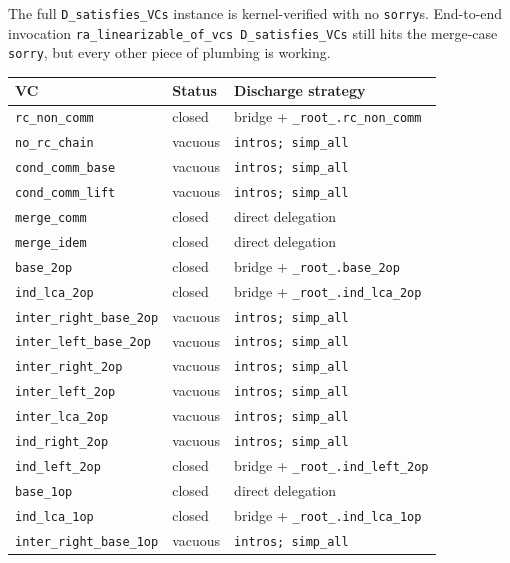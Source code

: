 \documentclass[11pt,a4paper]{article}
\theoremstyle{definition}
\theoremstyle{remark}
\newcommand{\sorry}{\texttt{sorry}}
\begin{document}
The full \texttt{D\_satisfies\_VCs} instance is kernel-verified with
no \sorry{}s. End-to-end invocation
\texttt{ra\_linearizable\_of\_vcs D\_satisfies\_VCs} still hits the
merge-case \sorry{}, but every other piece of plumbing is working.

\begin{table}[t]
  \centering
  \small
  \begin{tabular}{@{}llp{6cm}@{}}
    \toprule
    VC & Status & Discharge strategy \\
    \midrule
    \texttt{rc\_non\_comm}         & closed & bridge + \texttt{\_root\_.rc\_non\_comm} \\
    \texttt{no\_rc\_chain}         & vacuous & \texttt{intros; simp\_all} \\
    \texttt{cond\_comm\_base}      & vacuous & \texttt{intros; simp\_all} \\
    \texttt{cond\_comm\_lift}      & vacuous & \texttt{intros; simp\_all} \\
    \texttt{merge\_comm}           & closed & direct delegation \\
    \texttt{merge\_idem}           & closed & direct delegation \\
    \texttt{base\_2op}             & closed & bridge + \texttt{\_root\_.base\_2op} \\
    \texttt{ind\_lca\_2op}         & closed & bridge + \texttt{\_root\_.ind\_lca\_2op} \\
    \texttt{inter\_right\_base\_2op} & vacuous & \texttt{intros; simp\_all} \\
    \texttt{inter\_left\_base\_2op}  & vacuous & \texttt{intros; simp\_all} \\
    \texttt{inter\_right\_2op}       & vacuous & \texttt{intros; simp\_all} \\
    \texttt{inter\_left\_2op}        & vacuous & \texttt{intros; simp\_all} \\
    \texttt{inter\_lca\_2op}         & vacuous & \texttt{intros; simp\_all} \\
    \texttt{ind\_right\_2op}         & vacuous & \texttt{intros; simp\_all} \\
    \texttt{ind\_left\_2op}          & closed & bridge + \texttt{\_root\_.ind\_left\_2op} \\
    \texttt{base\_1op}               & closed & direct delegation \\
    \texttt{ind\_lca\_1op}           & closed & bridge + \texttt{\_root\_.ind\_lca\_1op} \\
    \texttt{inter\_right\_base\_1op} & vacuous & \texttt{intros; simp\_all} \\

\end{tabular}
\end{table}
\end{document}
